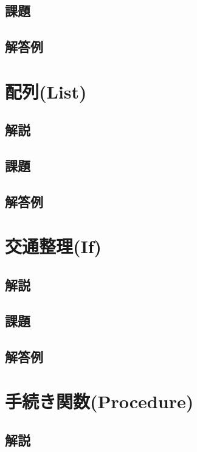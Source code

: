 \documentclass[10pt,a4j]{jbook}
\begin{document}
\subsection{課題}
 
\subsection{解答例}
 

\pagebreak
\section{配列(List)}
\subsection{解説}
 
\subsection{課題}
 
\subsection{解答例}
 

\pagebreak
\section{交通整理(If)}
\subsection{解説}
 
\subsection{課題}
 
\subsection{解答例}
 

\pagebreak
\section{手続き関数(Procedure)}
\subsection{解説}
 
\end{document}
